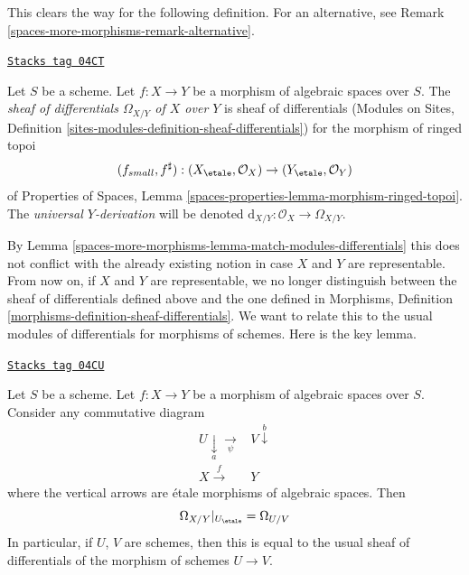 This clears the way for the following definition. For an alternative, see
Remark \ref{spaces-more-morphisms-remark-alternative}.

\begin{definition}
\label{spaces-more-morphisms-definition-sheaf-differentials}
\href{https://stacks.math.columbia.edu/tag/04CT}{\texttt{Stacks tag 04CT}}

Let $S$ be a scheme. Let $f : X \to Y$ be a morphism of algebraic spaces
over $S$. The {\it sheaf of differentials $\Omega_{X/Y}$ of $X$ over $Y$}
is sheaf of differentials
(Modules on Sites,
Definition \ref{sites-modules-definition-sheaf-differentials})
for the morphism of ringed topoi
$$
(f_{small}, f^\sharp) :
(X_\etale, \mathcal{O}_X)
\to
(Y_\etale, \mathcal{O}_Y)
$$
of
Properties of Spaces,
Lemma \ref{spaces-properties-lemma-morphism-ringed-topoi}.
The {\it universal $Y$-derivation} will be denoted
$\text{d}_{X/Y} : \mathcal{O}_X \to \Omega_{X/Y}$.
\end{definition}

By
Lemma \ref{spaces-more-morphisms-lemma-match-modules-differentials}
this does not conflict with the already existing
notion in case $X$ and $Y$ are representable. From now on, if $X$ and $Y$
are representable, we no longer distinguish between the sheaf of differentials
defined above and the one defined in
Morphisms, Definition \ref{morphisms-definition-sheaf-differentials}.
We want to relate this to the usual modules of differentials for
morphisms of schemes. Here is the key lemma.

\begin{lemma}
\label{spaces-more-morphisms-lemma-localize-differentials}
\href{https://stacks.math.columbia.edu/tag/04CU}{\texttt{Stacks tag 04CU}}

Let $S$ be a scheme. Let $f : X \to Y$ be a morphism of algebraic spaces
over $S$. Consider any commutative diagram
$$
\begin{array}{cc}U \underset{a}{\downarrow}\underset{\psi}{\longrightarrow} & V \overset{b}{\downarrow} \\ X \overset{f}{\longrightarrow} & Y\end{array}
$$
where the vertical arrows are \'etale morphisms of algebraic spaces. Then
$$
\Omega_{X/Y}|_{U_\etale} = \Omega_{U/V}
$$
In particular, if $U$, $V$ are schemes, then this is equal to the usual
sheaf of differentials of the morphism of schemes $U \to V$.
\end{lemma}

